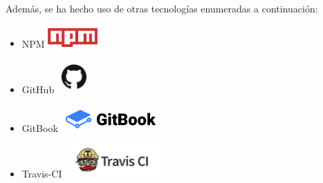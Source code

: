 Además, se ha hecho uso de otras tecnologías enumeradas a continuación:
\begin{itemize}
  \item NPM            \includegraphics[width=0.15\textwidth]{images/npm}
  \item GitHub         \includegraphics[width=0.1\textwidth]{images/github}
  \item GitBook        \includegraphics[width=0.3\textwidth]{images/gitbook}
  \item Travis-CI      \includegraphics[width=0.3\textwidth]{images/travis-ci-logo}
\end{itemize}
